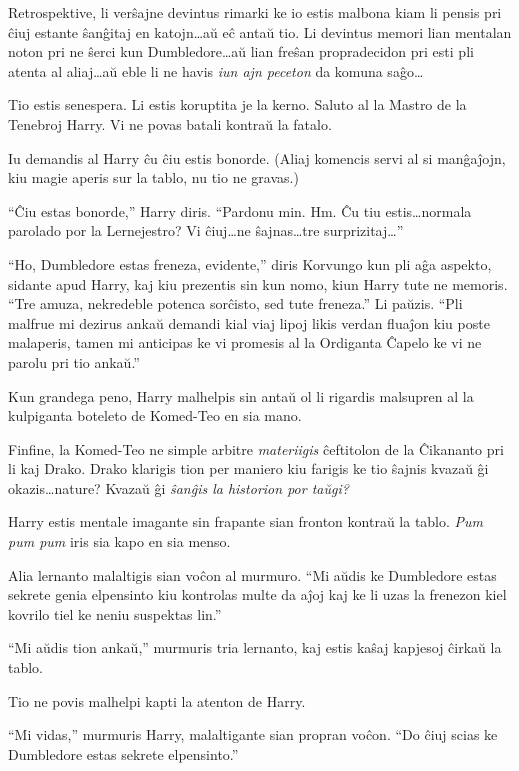 Retrospektive, li verŝajne devintus rimarki ke io estis malbona kiam
li pensis pri ĉiuj estante ŝanĝitaj en katojn\ldots aŭ eĉ antaŭ
tio. Li devintus memori lian mentalan noton pri ne ŝerci kun
Dumbledore\ldots aŭ lian freŝan propradecidon pri esti pli atenta al
aliaj\ldots aŭ eble li ne havis \emph{iun ajn peceton} da komuna
saĝo\ldots

Tio estis senespera. Li estis koruptita je la kerno. Saluto al la
Mastro de la Tenebroj Harry. Vi ne povas batali kontraŭ la fatalo.

Iu demandis al Harry ĉu ĉiu estis bonorde. (Aliaj komencis servi al si
manĝaĵojn, kiu magie aperis sur la tablo, nu tio ne gravas.)

``Ĉiu estas bonorde,'' Harry diris. ``Pardonu min. Hm. Ĉu tiu
estis\ldots normala parolado por la Lernejestro? Vi ĉiuj\ldots ne
ŝajnas\ldots tre surprizitaj\ldots''

``Ho, Dumbledore estas freneza, evidente,'' diris Korvungo kun pli aĝa
aspekto, sidante apud Harry, kaj kiu prezentis sin kun nomo, kiun
Harry tute ne memoris. ``Tre amuza, nekredeble potenca sorĉisto, sed
tute freneza.'' Li paŭzis. ``Pli malfrue mi dezirus ankaŭ demandi kial
viaj lipoj likis verdan fluaĵon kiu poste malaperis, tamen mi
anticipas ke vi promesis al la Ordiganta Ĉapelo ke vi ne parolu pri
tio ankaŭ.''

Kun grandega peno, Harry malhelpis sin antaŭ ol li rigardis malsupren
al la kulpiganta boteleto de Komed-Teo en sia mano.

Finfine, la Komed-Teo ne simple arbitre \emph{materiigis} ĉeftitolon
de la Ĉikananto pri li kaj Drako. Drako klarigis tion per maniero kiu
farigis ke tio ŝajnis kvazaŭ ĝi okazis\ldots nature? Kvazaŭ ĝi
\emph{ŝanĝis la historion por taŭgi?}

Harry estis mentale imagante sin frapante sian fronton kontraŭ la
tablo. \emph{Pum pum pum} iris sia kapo en sia menso.

Alia lernanto malaltigis sian voĉon al murmuro. ``Mi aŭdis ke
Dumbledore estas sekrete genia elpensinto kiu kontrolas multe da aĵoj
kaj ke li uzas la frenezon kiel kovrilo tiel ke neniu suspektas lin.''

``Mi aŭdis tion ankaŭ,'' murmuris tria lernanto, kaj estis kaŝaj
kapjesoj ĉirkaŭ la tablo.

Tio ne povis malhelpi kapti la atenton de Harry.

``Mi vidas,'' murmuris Harry, malaltigante sian propran voĉon. ``Do
ĉiuj scias ke Dumbledore estas sekrete elpensinto.''

